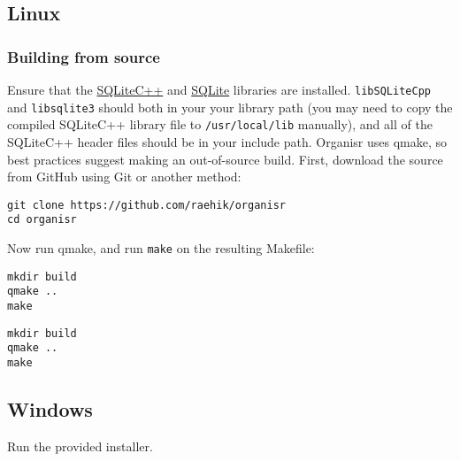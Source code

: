 \subsection{Linux}

\subsubsection{Building from source}

Ensure that the \href{http://srombauts.github.io/SQLiteCpp/}{SQLiteC++} and
\href{http://sqlite.org/download.html}{SQLite} libraries are installed.
\verb|libSQLiteCpp| and \verb|libsqlite3| should both in your your library path
(you may need to copy the compiled SQLiteC++ library file to
\verb|/usr/local/lib| manually), and all of the SQLiteC++ header files should be
in your include path. Organisr uses qmake, so best practices suggest making an
out-of-source build. First, download the source from GitHub using Git or another
method:

\begin{lstlisting}
git clone https://github.com/raehik/organisr
cd organisr
\end{lstlisting}

Now run qmake, and run \verb|make| on the resulting Makefile:

\begin{lstlisting}
mkdir build
qmake ..
make
\end{lstlisting}

\begin{verbatim}
mkdir build
qmake ..
make
\end{verbatim}


\subsection{Windows}

Run the provided installer.
